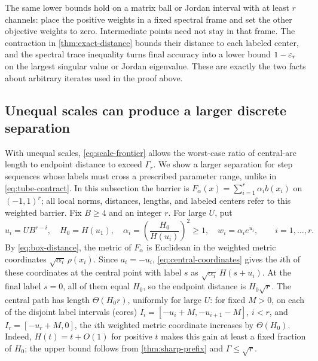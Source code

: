The same lower bounds hold on a matrix ball or Jordan interval with at
least $r$ channels: place the positive weights in a fixed spectral frame
and set the other objective weights to zero. Intermediate points need
not stay in that frame. The contraction
in \cref{thm:exact-distance} bounds their distance to each labeled center,
and the spectral trace inequality turns final accuracy into a lower bound
$1-\varepsilon_r$ on the largest singular value or Jordan eigenvalue. These are
exactly the two facts about arbitrary iterates used in the proof above.

\subsection{Unequal scales can produce a larger discrete separation}
With unequal scales, \eqref{eq:scale-frontier} allows the worst-case
ratio of central-arc length to endpoint distance to exceed $\Gamma_r$.
We show a larger separation for step sequences whose labels must cross
a prescribed parameter range, unlike in \eqref{eq:tube-contract}. In this subsection the barrier is
$F_\alpha(x)=\sum_{i=1}^r\alpha_i b(x_i)$ on $(-1,1)^r$;
all local norms, distances, lengths, and labeled centers refer to this
weighted barrier.
Fix $B\geq4$ and an integer $r$. For large $U$, put
\[
 u_i=UB^{r-i},\quad H_0=H(u_1),\quad
 \alpha_i=\left(\frac{H_0}{H(u_i)}\right)^2\geq1,\quad
 w_i=\alpha_i e^{u_i},\qquad i=1,\ldots,r.
\]
By \eqref{eq:box-distance}, the metric of $F_\alpha$ is Euclidean in the
weighted metric coordinates $\sqrt{\alpha_i}\,\rho(x_i)$. Since
$a_i=-u_i$, \eqref{eq:central-coordinates} gives the $i$th of these
coordinates at the central point with label $s$ as
$\sqrt{\alpha_i}\,H(s+u_i)$. At the final label $s=0$, all of them
equal $H_0$, so the endpoint distance is $H_0\sqrt r$. The central path has length
$\Theta(H_0r)$, uniformly for large $U$: for fixed $M>0$, on each of
the disjoint label intervals (cores) $I_i=[-u_i+M,-u_{i+1}-M]$, $i<r$,
and $I_r=[-u_r+M,0]$, the $i$th weighted metric coordinate increases by
$\Theta(H_0)$. Indeed, $H(t)=t+O(1)$ for positive $t$ makes this gain
at least a fixed fraction of $H_0$; the upper bound follows from
\cref{thm:sharp-prefix} and $\Gamma\leq\sqrt r$.

